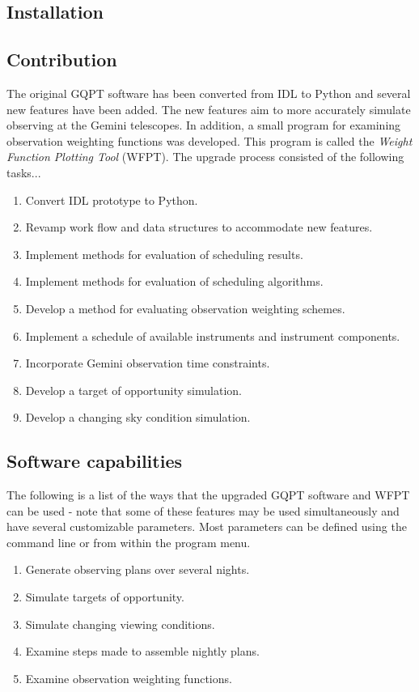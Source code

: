 \documentclass{article}
\begin{document}
\subsection{Installation}


\subsection{Contribution}
\label{sec:contribution}
The original GQPT software has been converted from IDL to Python and several new features have been added.  The new features aim to more accurately simulate observing at the Gemini telescopes.  In addition, a small program for examining observation weighting functions was developed.  This program is called the \textit{Weight Function Plotting Tool} (WFPT).  The upgrade process consisted of the following tasks...\\
\begin{enumerate}
\item Convert IDL prototype to Python.
\item Revamp work flow and data structures to accommodate new features.
\item Implement methods for evaluation of scheduling results.
\item Implement methods for evaluation of scheduling algorithms.
\item Develop a method for evaluating observation weighting schemes.
\item Implement a schedule of available instruments and instrument components.
\item Incorporate Gemini observation time constraints.
\item Develop a target of opportunity simulation.
\item Develop a changing sky condition simulation. 
\end{enumerate}

\subsection{Software capabilities}
\label{sec:uses}
The following is a list of the ways that the upgraded GQPT software and WFPT can be used - note that some of these features may be used simultaneously and have several customizable parameters.  Most parameters can be defined using the command line or from within the program menu.\\
\begin{enumerate}
\item Generate observing plans over several nights.
\item Simulate targets of opportunity.
\item Simulate changing viewing conditions.
\item Examine steps made to assemble nightly plans.
\item Examine observation weighting functions.
\end{enumerate}
\end{document}
